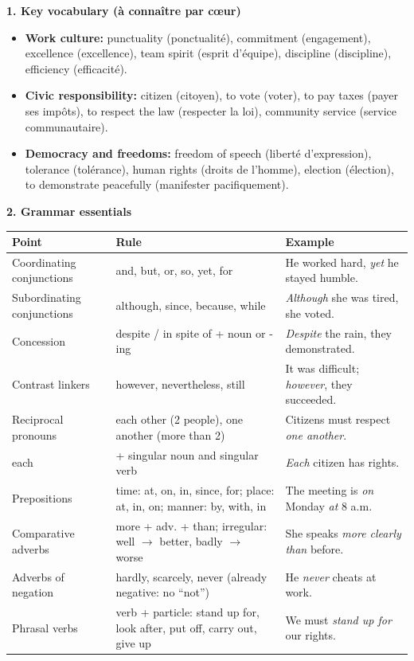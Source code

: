 \documentclass[11pt]{article}
\newcommand{\cle}[1]{{\popxbold\color{popdark}#1}}
\begin{document}
\begin{bilan}
\textbf{1. Key vocabulary (à connaître par c\oe ur)}
\begin{itemize}
\item \textbf{Work culture:} \cle{punctuality} (ponctualité), \cle{commitment} (engagement), \cle{excellence} (excellence), \cle{team spirit} (esprit d'équipe), \cle{discipline} (discipline), \cle{efficiency} (efficacité).
\item \textbf{Civic responsibility:} \cle{citizen} (citoyen), \cle{to vote} (voter), \cle{to pay taxes} (payer ses impôts), \cle{to respect the law} (respecter la loi), \cle{community service} (service communautaire).
\item \textbf{Democracy and freedoms:} \cle{freedom of speech} (liberté d'expression), \cle{tolerance} (tolérance), \cle{human rights} (droits de l'homme), \cle{election} (élection), \cle{to demonstrate peacefully} (manifester pacifiquement).
\end{itemize}

\textbf{2. Grammar essentials}
\begin{center}
\begin{tabularx}{\linewidth}{|l|X|X|}\hline
\rowcolor{popblueL} \textbf{Point} & \textbf{Rule} & \textbf{Example} \\ \hline
Coordinating conjunctions & and, but, or, so, \cle{yet}, \cle{for} & He worked hard, \emph{yet} he stayed humble. \\ \hline
Subordinating conjunctions & \cle{although}, \cle{since}, because, while & \emph{Although} she was tired, she voted. \\ \hline
Concession & \cle{despite} / \cle{in spite of} + noun or -ing & \emph{Despite} the rain, they demonstrated. \\ \hline
Contrast linkers & \cle{however}, \cle{nevertheless}, \cle{still} & It was difficult; \emph{however}, they succeeded. \\ \hline
Reciprocal pronouns & \cle{each other} (2 people), \cle{one another} (more than 2) & Citizens must respect \emph{one another}. \\ \hline
\cle{each} & + singular noun and singular verb & \emph{Each} citizen has rights. \\ \hline
Prepositions & time: at, on, in, since, for; place: at, in, on; manner: by, with, in & The meeting is \emph{on} Monday \emph{at} 8 a.m. \\ \hline
Comparative adverbs & more + adv. + than; irregular: well $\to$ better, badly $\to$ worse & She speaks \emph{more clearly than} before. \\ \hline
Adverbs of negation & \cle{hardly}, \cle{scarcely}, \cle{never} (already negative: no ``not'') & He \emph{never} cheats at work. \\ \hline
Phrasal verbs & verb + particle: \cle{stand up for}, \cle{look after}, \cle{put off}, \cle{carry out}, \cle{give up} & We must \emph{stand up for} our rights. \\ \hline
\end{tabularx}
\end{center}


\end{bilan}
\end{document}
